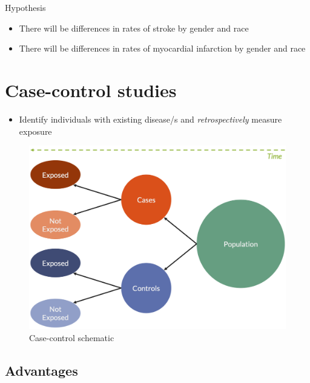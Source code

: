 \documentclass[
]{book}
\providecommand{\tightlist}{%
  \setlength{\itemsep}{0pt}\setlength{\parskip}{0pt}}
\begin{document}
Hypothesis

\begin{itemize}
\tightlist
\item
  There will be differences in rates of stroke by gender and race
\item
  There will be differences in rates of myocardial infarction by gender and race
\end{itemize}

\hypertarget{case-control-studies}{%
\section{Case-control studies}\label{case-control-studies}}

\begin{itemize}
\tightlist
\item
  Identify individuals with existing disease/s and \emph{retrospectively} measure exposure
\end{itemize}

\begin{figure}

{\centering \includegraphics[width=1\linewidth]{img/study_design/case_control_schematic} 

}

\caption{Case-control schematic}\label{fig:unnamed-chunk-4}
\end{figure}

\hypertarget{advantages-1}{%
\subsection{Advantages}\label{advantages-1}}
\end{document}
